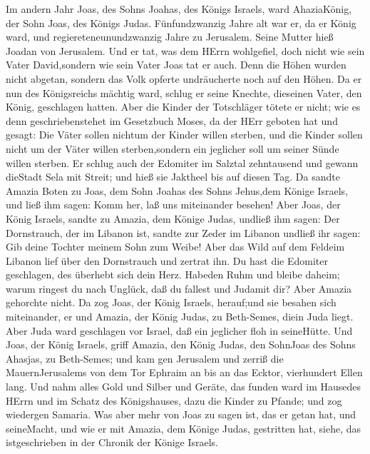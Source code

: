  Im andern Jahr Joas, des Sohns Joahas, des Königs Israels,
ward AhaziaKönig, der Sohn Joas, des Königs Judas. 
Fünfundzwanzig Jahre alt war er, da er König ward, und
regiereteneunundzwanzig Jahre zu Jerusalem. Seine Mutter hieß Joadan von
Jerusalem.  Und er tat, was dem HErrn wohlgefiel, doch nicht
wie sein Vater David,sondern wie sein Vater Joas tat er auch.
 Denn die Höhen wurden nicht abgetan, sondern das Volk
opferte undräucherte noch auf den Höhen.  Da er nun des
Königsreichs mächtig ward, schlug er seine Knechte, dieseinen Vater, den
König, geschlagen hatten.  Aber die Kinder der Totschläger
tötete er nicht; wie es denn geschriebenstehet im Gesetzbuch Moses, da
der HErr geboten hat und gesagt: Die Väter sollen nichtum der Kinder
willen sterben, und die Kinder sollen nicht um der Väter willen
sterben,sondern ein jeglicher soll um seiner Sünde willen sterben.
 Er schlug auch der Edomiter im Salztal zehntausend und
gewann dieStadt Sela mit Streit; und hieß sie Jaktheel bis auf diesen
Tag.  Da sandte Amazia Boten zu Joas, dem Sohn Joahas des
Sohns Jehus,dem Könige Israels, und ließ ihm sagen: Komm her, laß uns
miteinander besehen!  Aber Joas, der König Israels, sandte
zu Amazia, dem Könige Judas, undließ ihm sagen: Der Dornstrauch, der im
Libanon ist, sandte zur Zeder im Libanon undließ ihr sagen: Gib deine
Tochter meinem Sohn zum Weibe! Aber das Wild auf dem Feldeim Libanon
lief über den Dornstrauch und zertrat ihn.  Du hast die
Edomiter geschlagen, des überhebt sich dein Herz. Habeden Ruhm und
bleibe daheim; warum ringest du nach Unglück, daß du fallest und Judamit
dir?  Aber Amazia gehorchte nicht. Da zog Joas, der König
Israels, herauf;und sie besahen sich miteinander, er und Amazia, der
König Judas, zu Beth-Semes, diein Juda liegt.  Aber Juda
ward geschlagen vor Israel, daß ein jeglicher floh in seineHütte.
 Und Joas, der König Israels, griff Amazia, den König
Judas, den SohnJoas des Sohns Ahasjas, zu Beth-Semes; und kam gen
Jerusalem und zerriß die MauernJerusalems von dem Tor Ephraim an bis an
das Ecktor, vierhundert Ellen lang.  Und nahm alles Gold
und Silber und Geräte, das funden ward im Hausedes HErrn und im Schatz
des Königshauses, dazu die Kinder zu Pfande; und zog wiedergen Samaria.
 Was aber mehr von Joas zu sagen ist, das er getan hat, und
seineMacht, und wie er mit Amazia, dem Könige Judas, gestritten hat,
siehe, das istgeschrieben in der Chronik der Könige Israels.
